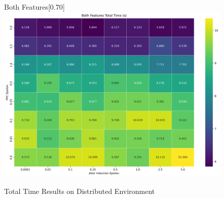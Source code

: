 \begin{figure}[htbp]
\begin{subcaptionbox}{Both Features\label{fig:dist_both_total_time}}[0.70\textwidth]
        {\includegraphics[width=\linewidth]{Chapters/Figures/Plots/dist_total_time_50_heatmap_5mib.png}}
    \end{subcaptionbox}
    \caption{Total Time Results on Distributed Environment}\label{fig:dist_total_time}
\end{figure}

